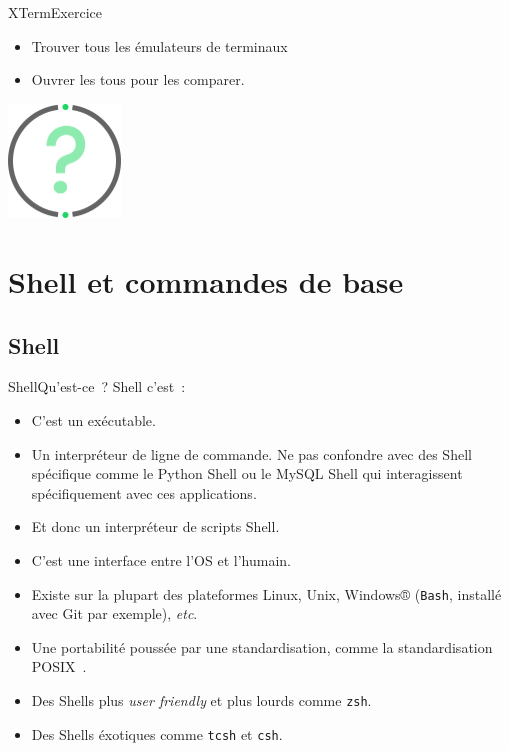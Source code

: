 \documentclass{beamer}
\begin{document}
    \begin{frame}{XTerm}{Exercice \execcounterdispinc}
        \begin{itemize}
            \item Trouver tous les émulateurs de terminaux
            \item Ouvrer les tous pour les comparer.
        \end{itemize}
        \bigbreak
        \centering
        \includegraphics[width=3cm]{image/question-mark}
    \end{frame}


    \section{Shell et commandes de base}\label{sec:shell-and-command}

    \subsection{Shell}\label{subsec:shell}

    \begin{frame}{Shell}{Qu'est-ce~?}
        Shell c'est~:
        \begin{itemize}
            \item C'est un exécutable.
            \item Un interpréteur de ligne de commande.
            Ne pas confondre avec des Shell spécifique comme le Python Shell ou le MySQL Shell qui interagissent spécifiquement avec ces applications.
            \item Et donc un interpréteur de scripts Shell.
            \item C'est une interface entre l'OS et l'humain.
            \item Existe sur la plupart des plateformes Linux, Unix, Windows® (\lstinline{Bash}, installé avec Git par exemple), \textit{etc}.
            \item Une portabilité poussée par une standardisation, comme la standardisation POSIX~.
            \item Des Shells plus \textit{user friendly} et plus lourds comme \lstinline{zsh}.
            \item Des Shells éxotiques comme \lstinline{tcsh} et \lstinline{csh}.
        \end{itemize}
    \end{frame}
\end{document}
